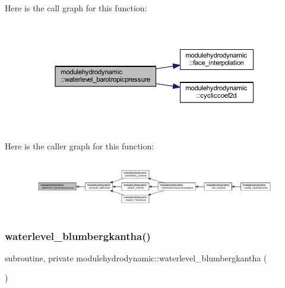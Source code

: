 Here is the call graph for this function\+:\nopagebreak
\begin{figure}[H]
\begin{center}
\leavevmode
\includegraphics[width=350pt]{namespacemodulehydrodynamic_a5e6cdcb5121c8a2db4d545b07bfd4d73_cgraph}
\end{center}
\end{figure}
Here is the caller graph for this function\+:\nopagebreak
\begin{figure}[H]
\begin{center}
\leavevmode
\includegraphics[width=350pt]{namespacemodulehydrodynamic_a5e6cdcb5121c8a2db4d545b07bfd4d73_icgraph}
\end{center}
\end{figure}
\mbox{\label{namespacemodulehydrodynamic_ae5c38adbe04a8331efddb3eb147a9de3}} 
\subsubsection{\texorpdfstring{waterlevel\+\_\+blumbergkantha()}{waterlevel\_blumbergkantha()}}
{\footnotesize\ttfamily subroutine, private modulehydrodynamic\+::waterlevel\+\_\+blumbergkantha (\begin{DoxyParamCaption}{ }\end{DoxyParamCaption})\hspace{0.3cm}{\ttfamily [private]}}

